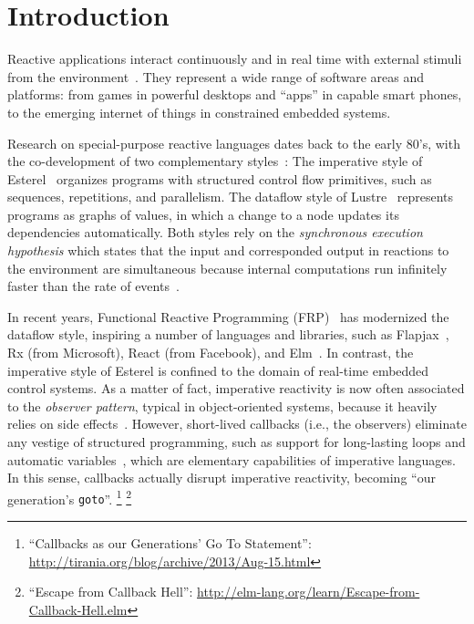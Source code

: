 \documentclass{sigplanconf}
\newcommand{\code}[1] {{\small{\texttt{#1}}}}
\newcommand{\1}{\;}
\newcommand{\2}{\;\;}
\newcommand{\3}{\;\;\;}
\newcommand{\5}{\;\;\;\;\;}
\begin{document}

\section{Introduction}
\label{sec.intro}

Reactive applications interact continuously and in real time with external 
stimuli from the environment~\cite{statecharts.reactive,rp.synchronous}.
They represent a wide range of software areas and platforms: from games in 
powerful desktops and ``apps'' in capable smart phones, to the emerging 
internet of things in constrained embedded systems.

Research on special-purpose reactive languages dates back to the early 80's, 
with the co-development of two complementary 
styles~\cite{rp.twelve,rp.hypothesis}:
%
The imperative style of Esterel~\cite{esterel.ieee91} organizes programs with 
structured control flow primitives, such as sequences, repetitions, and 
parallelism.
%
The dataflow style of Lustre~\cite{lustre.ieee91} represents programs as graphs 
of values, in which a change to a node updates its dependencies automatically.
%
Both styles rely on the \emph{synchronous execution hypothesis} which states 
that the input and corresponded output in reactions to the environment are 
simultaneous because internal computations run infinitely faster than the rate 
of events~\cite{rp.hypothesis}.

In recent years, Functional Reactive Programming (FRP)~\cite{frp.principles} 
has modernized the dataflow style, inspiring a number of languages and 
libraries, such as Flapjax~\cite{frp.flapjax}, Rx (from Microsoft), React (from 
Facebook), and Elm~\cite{frp.elm}.
%
In contrast, the imperative style of Esterel is confined to the domain of 
real-time embedded control systems.
%
As a matter of fact, imperative reactivity is now often associated to the 
\emph{observer pattern}, typical in object-oriented systems, because it heavily 
relies on side effects~\cite{rp.deprecating,rp.rescala}.
%
However, short-lived callbacks (i.e., the observers) eliminate any vestige of 
structured programming, such as support for long-lasting loops and automatic 
variables~\cite{sync_async.cooperative}, which are elementary capabilities of 
imperative languages.
%
In this sense, callbacks actually disrupt imperative reactivity, becoming ``our 
generation's \code{goto}''.%
\footnote{``Callbacks as our Generations' Go To Statement'':
\url{http://tirania.org/blog/archive/2013/Aug-15.html}}%
\footnote{``Escape from Callback Hell'':
\url{http://elm-lang.org/learn/Escape-from-Callback-Hell.elm}}
\end{document}
